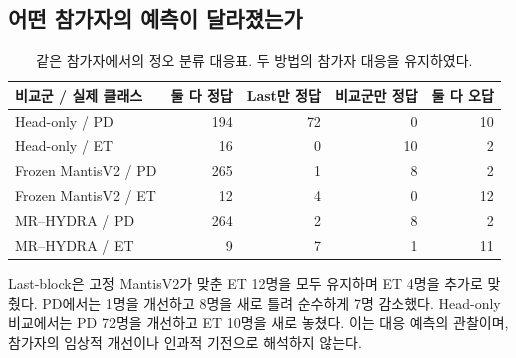 \documentclass[11pt,a4paper]{article}
\begin{document}
\subsection{어떤 참가자의 예측이 달라졌는가}
\begin{table}[H]\centering\small\setlength{\tabcolsep}{4pt}
\caption{같은 참가자에서의 정오 분류 대응표. 두 방법의 참가자 대응을 유지하였다.}
\begin{tabular}{@{}lrrrr@{}}\toprule
비교군 / 실제 클래스 & 둘 다 정답 & Last만 정답 & 비교군만 정답 & 둘 다 오답\\\midrule
Head-only / PD & 194 & 72 & 0 & 10 \\
Head-only / ET & 16 & 0 & 10 & 2 \\
Frozen MantisV2 / PD & 265 & 1 & 8 & 2 \\
Frozen MantisV2 / ET & 12 & 4 & 0 & 12 \\
MR--HYDRA / PD & 264 & 2 & 8 & 2 \\
MR--HYDRA / ET & 9 & 7 & 1 & 11 \\
\bottomrule\end{tabular}
\end{table}
Last-block은 고정 MantisV2가 맞춘 ET 12명을 모두 유지하며 ET 4명을 추가로 맞췄다.
PD에서는 1명을 개선하고 8명을 새로 틀려 순수하게 7명 감소했다.
Head-only 비교에서는 PD 72명을 개선하고 ET 10명을 새로 놓쳤다.
이는 대응 예측의 관찰이며, 참가자의 임상적 개선이나 인과적 기전으로 해석하지 않는다.
\end{document}
